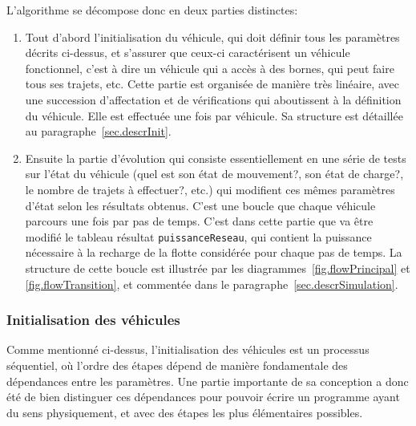 		L'algorithme se décompose donc en deux parties distinctes:
		\begin{enumerate}
			\item Tout d'abord l'initialisation du véhicule, qui doit définir tous les paramètres décrits ci-dessus, et s'assurer que ceux-ci caractérisent un véhicule fonctionnel, c'est à dire un véhicule qui a accès à des bornes, qui peut faire tous ses trajets, etc. Cette partie est organisée de manière très linéaire, avec une succession d'affectation et de vérifications qui aboutissent à la définition du véhicule. Elle est effectuée une fois par véhicule. Sa structure est détaillée au paragraphe~\vref{sec.descrInit}.
			\item Ensuite la partie d'évolution qui consiste essentiellement en une série de tests sur l'état du véhicule (quel est son état de mouvement?, son état de charge?, le nombre de trajets à effectuer?, etc.) qui modifient ces mêmes paramètres d'état selon les résultats obtenus. C'est une boucle que chaque véhicule parcours une fois par pas de temps. C'est dans cette partie que va être modifié le tableau résultat \lstinline|puissanceReseau|, qui contient la puissance nécessaire à la recharge de la flotte considérée pour chaque pas de temps. La structure de cette boucle est illustrée par les diagrammes~\ref{fig.flowPrincipal} et \vref{fig.flowTransition}, et commentée dans le paragraphe~\vref{sec.descrSimulation}.
		\end{enumerate}
		
		\subsubsection{Initialisation des véhicules \label{sec.descrInit}}
			Comme mentionné ci-dessus, l'initialisation des véhicules est un processus séquentiel, où l'ordre des étapes dépend de manière fondamentale des dépendances entre les paramètres. Une partie importante de sa conception a donc été de bien distinguer ces dépendances pour pouvoir écrire un programme ayant du sens physiquement, et avec des étapes les plus élémentaires possibles.
			
